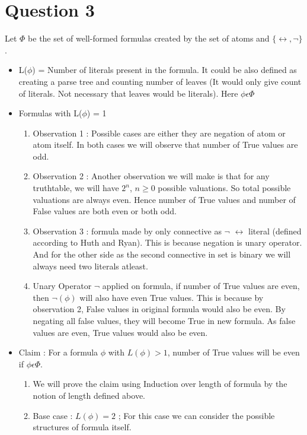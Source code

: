 \documentclass[12pt]{scrartcl}
\begin{document}
\newpage
\section{Question 3}
Let $\Phi$ be the set of well-formed formulas created by the set of atoms and $\{\leftrightarrow,\lnot\}$.
\begin{itemize}
    \item L($\phi$) = Number of literals present in the formula. It could be also defined as creating a parse tree and counting number of leaves (It would only give count of literals. Not necessary that leaves would be literals). Here $\phi \epsilon \Phi$
    \item Formulas with L($\phi$) = 1
    \begin{enumerate}
        \item Observation 1 : Possible cases are either they are negation of atom or atom itself. In both cases we will observe that number of True values are odd.
        \item Observation 2 : Another observation we will make is that for any truthtable, we will have $2^{n}$, $n \geq 0$ possible valuations. So total possible valuations are always even. Hence number of True values and number of False values are both even or both odd.
        \item Observation 3 : formula made by only connective as $\neg$ $\leftrightarrow$ literal (defined according to Huth and Ryan). This is because negation is unary operator. And for the other side as the second connective in set is binary we will always need two literals atleast.
        \item  Unary Operator $\neg$ applied on formula, if number of True values are even, then $\neg (\phi)$ will also have even True values. This is because by observation 2, False values in original formula would also be even. By negating all false values, they will become True in new formula. As false values are even, True values would also be even.
    \end{enumerate}
    \item Claim : For a formula $\phi$ with $L(\phi) > 1$, number of True values will be even if $\phi \epsilon \Phi$.
    \begin{enumerate}
        \item We will prove the claim using Induction over length of formula by the notion of length defined above.
        \item Base case : $L(\phi)=2$ ; For this case we can consider the possible structures of formula itself. 

\end{enumerate}
\end{itemize}
\end{document}
